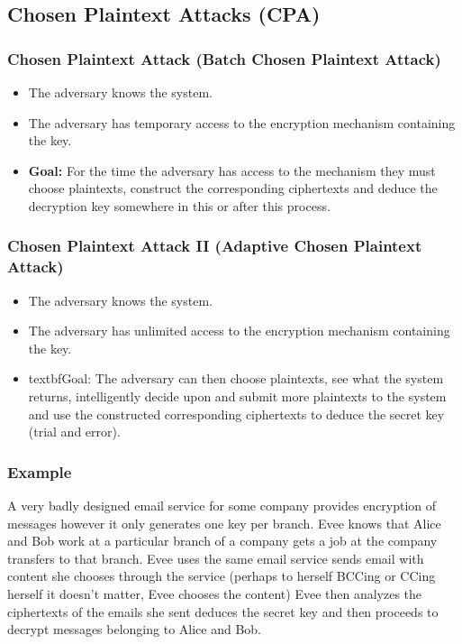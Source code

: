 \bigskip

\subsection*{Chosen Plaintext Attacks (CPA)}

\subsubsection*{Chosen Plaintext Attack (Batch Chosen Plaintext Attack)}

\begin{itemize}
\item The adversary knows the system.
\item The adversary has temporary access to the encryption mechanism containing the key.
\item \textbf{Goal:} For the time the adversary has access to the mechanism they must choose plaintexts, construct the corresponding ciphertexts and deduce the decryption key somewhere in this or after this process.
\end{itemize}

\bigskip

\subsubsection*{Chosen Plaintext Attack II (Adaptive Chosen Plaintext Attack)}

\begin{itemize}
\item The adversary knows the system.
\item The adversary has unlimited access to the encryption mechanism containing the key.
\item textbf{Goal:} The adversary can then choose plaintexts, see what the system returns, intelligently decide upon and submit more plaintexts to the system and use the constructed corresponding ciphertexts to deduce the secret key (trial and error).
\end{itemize}

\subsubsection*{Example}
A very badly designed email service for some company provides encryption of messages however it only generates one key per branch.
\newline
Evee knows that Alice and Bob work at a particular branch of a company gets a job at the company transfers to that branch. 
\newline
Evee uses the same email service sends email with content she chooses through the service (perhaps to herself BCCing or CCing herself it doesn’t matter, Evee chooses the content)  Evee then analyzes the ciphertexts of the emails she sent deduces the secret key and then proceeds to decrypt messages belonging to Alice and Bob. 
\newline

